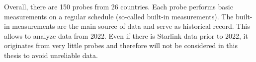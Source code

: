 Overall, there are 150 probes from 26 countries. Each probe performs basic
measurements on a regular schedule (so-called built-in measurements). The
built-in measurements are the main source of data and serve as historical
record. This allows to analyze data from 2022. Even if there is Starlink data
prior to 2022, it originates from very little probes and therefore will not be
considered in this thesis to avoid unreliable data.
